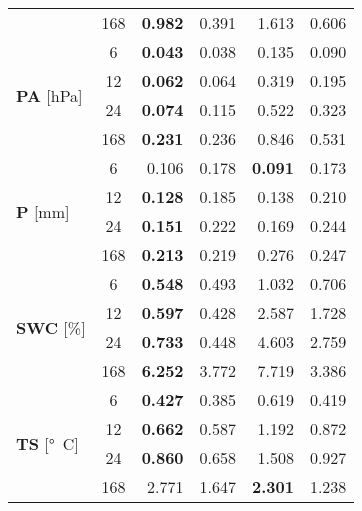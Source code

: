 \begin{table}
\begin{tabular}{p{2.1cm}c|rr|rr}
 & 168 & \bfseries 0.982 & 0.391 & 1.613 & 0.606 \\
\cline{1-6}
\multirow[c]{4}{*}{\parbox{2.1cm}{\textbf{PA} [\si{hPa}]}} & 6 & \bfseries 0.043 & 0.038 & 0.135 & 0.090 \\
 & 12 & \bfseries 0.062 & 0.064 & 0.319 & 0.195 \\
 & 24 & \bfseries 0.074 & 0.115 & 0.522 & 0.323 \\
 & 168 & \bfseries 0.231 & 0.236 & 0.846 & 0.531 \\
\cline{1-6}
\multirow[c]{4}{*}{\parbox{2.1cm}{\textbf{P} [\si{mm}]}} & 6 & 0.106 & 0.178 & \bfseries 0.091 & 0.173 \\
 & 12 & \bfseries 0.128 & 0.185 & 0.138 & 0.210 \\
 & 24 & \bfseries 0.151 & 0.222 & 0.169 & 0.244 \\
 & 168 & \bfseries 0.213 & 0.219 & 0.276 & 0.247 \\
\cline{1-6}
\multirow[c]{4}{*}{\parbox{2.1cm}{\textbf{SWC} [\si{\%}]}} & 6 & \bfseries 0.548 & 0.493 & 1.032 & 0.706 \\
 & 12 & \bfseries 0.597 & 0.428 & 2.587 & 1.728 \\
 & 24 & \bfseries 0.733 & 0.448 & 4.603 & 2.759 \\
 & 168 & \bfseries 6.252 & 3.772 & 7.719 & 3.386 \\
\cline{1-6}
\multirow[c]{4}{*}{\parbox{2.1cm}{\textbf{TS} [\si{°C}]}} & 6 & \bfseries 0.427 & 0.385 & 0.619 & 0.419 \\
 & 12 & \bfseries 0.662 & 0.587 & 1.192 & 0.872 \\
 & 24 & \bfseries 0.860 & 0.658 & 1.508 & 0.927 \\
 & 168 & 2.771 & 1.647 & \bfseries 2.301 & 1.238 \\
\cline{1-6}
\bottomrule
\end{tabular}
\end{table}
